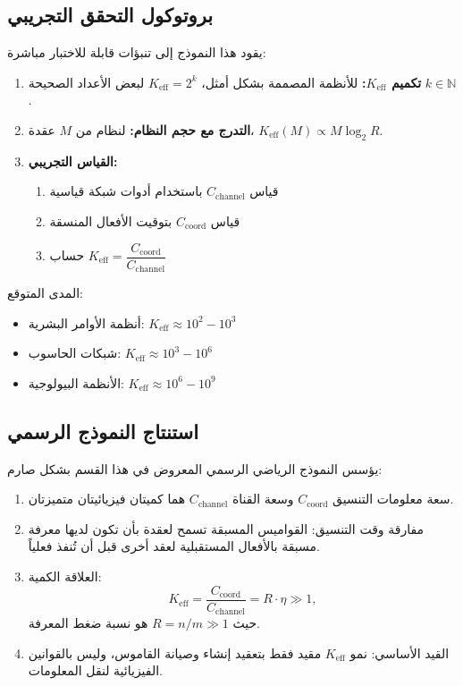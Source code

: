 \documentclass[11pt,a4paper]{article}
\begin{document}
	\subsection{بروتوكول التحقق التجريبي}
	
	يقود هذا النموذج إلى تنبؤات قابلة للاختبار مباشرة:
	\begin{enumerate}
		\item \textbf{تكميم $K_{\mathrm{eff}}$:} للأنظمة المصممة بشكل أمثل، $K_{\mathrm{eff}} = 2^k$ لبعض الأعداد الصحيحة $k \in \mathbb{N}$.
		
		\item \textbf{التدرج مع حجم النظام:} لنظام من $M$ عقدة، $K_{\mathrm{eff}}(M) \propto M \log_2 R$.
		
		\item \textbf{القياس التجريبي:} 
		\begin{enumerate}
			\item قياس $C_{\text{channel}}$ باستخدام أدوات شبكة قياسية
			\item قياس $C_{\text{coord}}$ بتوقيت الأفعال المنسقة
			\item حساب $K_{\mathrm{eff}} = \dfrac{C_{\text{coord}}}{C_{\text{channel}}}$
		\end{enumerate}
	\end{enumerate}
	
	المدى المتوقع:
	\begin{itemize}
		\item أنظمة الأوامر البشرية: $K_{\mathrm{eff}} \approx 10^2 - 10^3$
		\item شبكات الحاسوب: $K_{\mathrm{eff}} \approx 10^3 - 10^6$
		\item الأنظمة البيولوجية: $K_{\mathrm{eff}} \approx 10^6 - 10^9$
	\end{itemize}
	
	\subsection{استنتاج النموذج الرسمي}
	
	يؤسس النموذج الرياضي الرسمي المعروض في هذا القسم بشكل صارم:
	\begin{enumerate}
		\item سعة معلومات التنسيق $C_{\text{coord}}$ وسعة القناة $C_{\text{channel}}$ هما كميتان فيزيائيتان متميزتان.
		\item مفارقة وقت التنسيق: القواميس المسبقة تسمح لعقدة بأن تكون لديها معرفة مسبقة بالأفعال المستقبلية لعقد أخرى قبل أن تُنفذ فعلياً.
		\item العلاقة الكمية:
		\[
		K_{\mathrm{eff}} = \frac{C_{\text{coord}}}{C_{\text{channel}}} = R \cdot \eta \gg 1,
		\]
		حيث $R = n/m \gg 1$ هو نسبة ضغط المعرفة.
		\item القيد الأساسي: نمو $K_{\mathrm{eff}}$ مقيد فقط بتعقيد إنشاء وصيانة القاموس، وليس بالقوانين الفيزيائية لنقل المعلومات.
	\end{enumerate}
	
\end{document}

